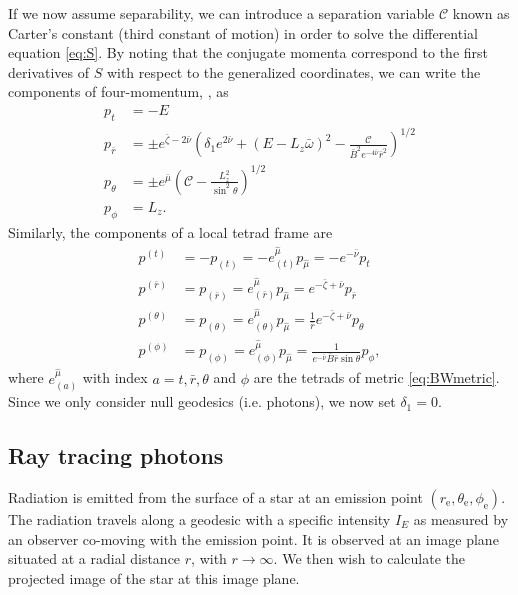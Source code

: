 \documentclass{aa}
\makeatletter
\def\fvec#1{\underline{\sbox\tw@{$#1$}\dp\tw@\z@\box\tw@}}
\newcommand{\Ca}{\ensuremath{\mathcal{C}}}
\newcommand{\rb}{\ensuremath{\bar{r}}}
\newcommand{\wb}{\ensuremath{\bar{\omega}}}
\newcommand{\nub}{\ensuremath{\bar{\nu}}}
\newcommand{\zetab}{\ensuremath{\bar{\zeta}}}
\newcommand{\Bb}{\ensuremath{\bar{B}}}
\newcommand{\mub}{\ensuremath{\bar{\mu}}}
\makeatother
\begin{document}
If we now assume separability, we can introduce a separation variable $\Ca$ known as Carter's constant (third constant of motion) in order to solve the differential equation \eqref{eq:S}.  
By noting that the conjugate momenta correspond to the first derivatives of $S$ with respect to the generalized coordinates, we can write the components of four-momentum, \fvec{p}, as 
\begin{align}
  p_t        &= -E \label{eq:p_t}\\
  p_{\rb}    &= \pm e^{\zetab - 2\nub} \left( \delta_1 e^{2\nub} + (E - L_z \wb)^2 - \frac{\Ca}{\Bb^2 e^{-4\nub} \rb^2} \right)^{1/2}\label{eq:p_r}\\
  p_{\theta} &= \pm e^{\mub} \left( \Ca - \frac{L_z^2}{\sin^2\theta} \right)^{1/2}\label{eq:p_the}\\
  p_{\phi}   &= L_z\label{eq:p_p}.
\end{align}
Similarly, the components of a local tetrad frame are
\begin{align}
  p^{(t)} &= -p_{(t)} = -e_{(t)}^{\hat{\mu}} p_{\hat{\mu}} = -e^{-\nub}p_t \label{eq:tetp_t}\\
  p^{(\rb)} &= p_{(\rb)} = e_{(\rb)}^{\hat{\mu}} p_{\hat{\mu}} = e^{-\zetab + \nub} p_{\rb} \label{eq:tetp_r}\\
  p^{(\theta)} &= p_{(\theta)} = e_{(\theta)}^{\hat{\mu}} p_{\hat{\mu}} = \frac{1}{\rb} e^{-\zetab+\nub} p_{\theta} \label{eq:tetp_theta}\\
  p^{(\phi)} &= p_{(\phi)} = e_{(\phi)}^{\hat{\mu}} p_{\hat{\mu}} = \frac{1}{e^{-\nub} \Bb \rb \sin\theta} p_{\phi} \label{eq:tetp_phi},
\end{align}
where $e^{\hat{\mu}}_{(a)}$ with index $a = t, \rb, \theta$ and $\phi$ are the tetrads of metric \eqref{eq:BWmetric}.
Since we only consider null geodesics (i.e. photons), we now set $\delta_1 = 0$.

\subsection{Ray tracing photons}\label{sect:raytracing}
Radiation is emitted from the surface of a star at an emission point $(r_{\mathrm{e}},\theta_{\mathrm{e}},\phi_{\mathrm{e}})$.  
The radiation travels along a geodesic with a specific intensity $I_{E}$ as measured by an observer co-moving with the emission point.  
It is observed at an image plane situated at a radial distance $r$, with $r\rightarrow\infty$.  
We then wish to calculate the projected image of the star at this image plane.
\end{document}
